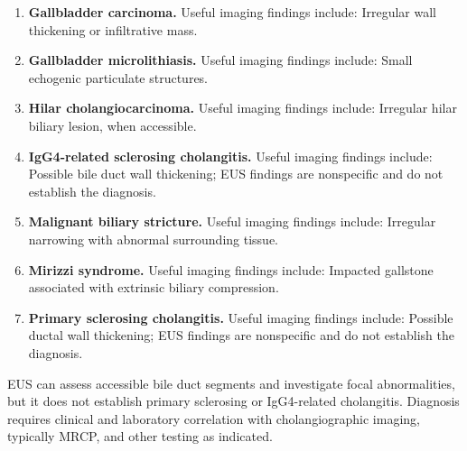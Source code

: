 \begin{enumerate}[leftmargin=*,itemsep=0.45em,topsep=0.4em]
\item \textbf{Gallbladder carcinoma.} Useful imaging findings include: Irregular wall thickening or infiltrative mass.
\item \textbf{Gallbladder microlithiasis.} Useful imaging findings include: Small echogenic particulate structures.
\item \textbf{Hilar cholangiocarcinoma.} Useful imaging findings include: Irregular hilar biliary lesion, when accessible.
\item \textbf{IgG4-related sclerosing cholangitis.} Useful imaging findings include: Possible bile duct wall thickening; EUS findings are nonspecific and do not establish the diagnosis.
\item \textbf{Malignant biliary stricture.} Useful imaging findings include: Irregular narrowing with abnormal surrounding tissue.
\item \textbf{Mirizzi syndrome.} Useful imaging findings include: Impacted gallstone associated with extrinsic biliary compression.
\item \textbf{Primary sclerosing cholangitis.} Useful imaging findings include: Possible ductal wall thickening; EUS findings are nonspecific and do not establish the diagnosis.
\end{enumerate}
EUS can assess accessible bile duct segments and investigate focal abnormalities, but it does not establish primary sclerosing or IgG4-related cholangitis. Diagnosis requires clinical and laboratory correlation with cholangiographic imaging, typically MRCP, and other testing as indicated.

